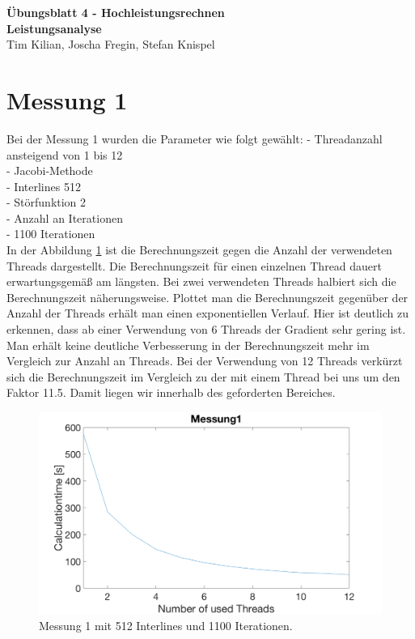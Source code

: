 \documentclass[11pt,a4paper]{article}
\begin{document}
\Large\textbf{{{\noindent Übungsblatt 4 - Hochleistungsrechnen\\}}}
\textbf{{Leistungsanalyse\\}}
Tim Kilian, Joscha Fregin, Stefan Knispel


\section{Messung 1}

Bei der Messung 1 wurden die Parameter wie folgt gewählt:
- Threadanzahl ansteigend von 1 bis 12 \\
- Jacobi-Methode \\
- Interlines 512 \\
- Störfunktion 2 \\
- Anzahl an Iterationen \\
- 1100 Iterationen \\

\noindent In der Abbildung \ref{messung1} ist die Berechnungszeit gegen die Anzahl der verwendeten Threads dargestellt. Die Berechnungszeit für einen einzelnen Thread dauert erwartungsgemäß am längsten. Bei zwei verwendeten Threads halbiert sich die Berechnungszeit näherungsweise. 
Plottet man die Berechnungszeit gegenüber der Anzahl der Threads erhält man einen exponentiellen Verlauf. Hier ist deutlich zu erkennen, dass ab einer Verwendung von 6 Threads der Gradient sehr gering ist. Man erhält keine deutliche Verbesserung in der Berechnungszeit mehr im Vergleich zur Anzahl an Threads. 
Bei der Verwendung von 12 Threads verkürzt sich die Berechnungszeit im Vergleich zu der mit einem Thread bei uns um den Faktor 11.5. Damit liegen wir innerhalb des geforderten Bereiches.

\begin{figure}[htb]
\centering
\includegraphics[width=1.0\textwidth,angle=0]{Messung1.png}
\caption{Messung 1 mit 512 Interlines und 1100 Iterationen.}
\label{messung1}
\end{figure}
\end{document}
